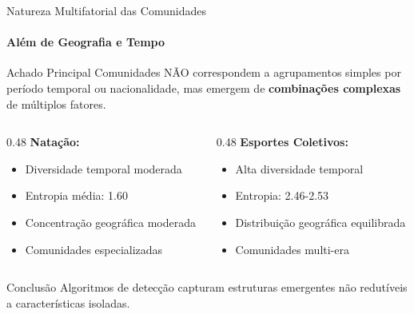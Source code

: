 \begin{frame}{Natureza Multifatorial das Comunidades}
    \framesubtitle{Além de Geografia e Tempo}
    \begin{alertblock}{Achado Principal}
        Comunidades NÃO correspondem a agrupamentos simples por período temporal ou nacionalidade, mas emergem de \textbf{combinações complexas} de múltiplos fatores.
    \end{alertblock}

    \vspace{0.3cm}
    \begin{columns}[T]
        \begin{column}{0.48\textwidth}
            \textbf{Natação:}
            \begin{itemize}
                \item Diversidade temporal moderada
                \item Entropia média: 1.60
                \item Concentração geográfica moderada
                \item Comunidades especializadas
            \end{itemize}
        \end{column}
        \begin{column}{0.48\textwidth}
            \textbf{Esportes Coletivos:}
            \begin{itemize}
                \item Alta diversidade temporal
                \item Entropia: 2.46-2.53
                \item Distribuição geográfica equilibrada
                \item Comunidades multi-era
            \end{itemize}
        \end{column}
    \end{columns}

    \vspace{0.2cm}
    \begin{block}{Conclusão}
        \footnotesize
        Algoritmos de detecção capturam estruturas emergentes não redutíveis a características isoladas.
    \end{block}
\end{frame}

